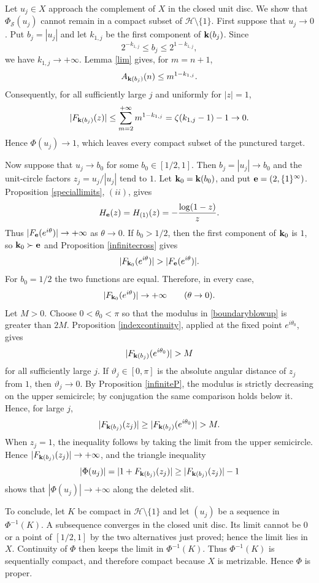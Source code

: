 \documentclass[12pt,a4paper]{amsart}
\makeatletter
\numberwithin{equation}{section}
\renewenvironment{proof}[1][Proof]{%
  \par\pushQED{\qed}%
  \normalfont\topsep6\p@\@plus6\p@\relax
  \trivlist
  \item[\hskip\labelsep\bfseries #1:]\ignorespaces
}{%
  \popQED\endtrivlist\@endpefalse
}
\theoremstyle{plain}
\theoremstyle{definition}
\makeatother
\begin{document}
\begin{proof}
Let $u_j\in X$ approach the complement of $X$ in the closed unit disc.  We show that $\Phi_{\mathcal{S}}(u_j)$ cannot remain in a compact subset of
$\mathcal{H}\setminus\{1\}$. First suppose that $u_j\rightarrow0$.  Put $b_j=|u_j|$ and let $k_{1,j}$ be the first component of ${\bf k}(b_j)$.  Since
\[
2^{-k_{1,j}}\leq b_j\leq 2^{1-k_{1,j}},
\]
we have $k_{1,j}\rightarrow+\infty$.  Lemma \ref{lim} gives, for $m=n+1$,
\[
A_{{\bf k}(b_j)}(n)\leq m^{1-k_{1,j}}.
\]
Consequently, for all sufficiently large $j$ and uniformly for $|z|=1$,
\[
|F_{{\bf k}(b_j)}(z)|
\leq\sum_{m=2}^{+\infty}m^{1-k_{1,j}}
=\zeta(k_{1,j}-1)-1
\rightarrow0.
\]
Hence $\Phi(u_j)\rightarrow1$, which leaves every compact subset of the punctured target.

Now suppose that $u_j\rightarrow b_0$ for some $b_0\in[1/2,1]$.  Then $b_j=|u_j|\rightarrow b_0$ and the unit-circle factors
$z_j=u_j/|u_j|$ tend to $1$.  Let ${\bf k}_0={\bf k}(b_0)$, and put
${\bf e}=(2,\{1\}^{\infty})$.  Proposition \ref{speciallimits}, $(ii)$, gives
\[
H_{\bf e}(z)=H_{(1)}(z)=-\frac{\log(1-z)}z.
\]
Thus $|F_{\bf e}(e^{i\theta})|\rightarrow+\infty$ as
$\theta\rightarrow0$.  If $b_0>1/2$, then the first component of ${\bf k}_0$ is $1$, so
${\bf k}_0\succ{\bf e}$ and Proposition \ref{infinitecross} gives
\[
|F_{{\bf k}_0}(e^{i\theta})|>|F_{\bf e}(e^{i\theta})|.
\]
For $b_0=1/2$ the two functions are equal.  Therefore, in every case,
\begin{equation}\label{boundaryblowup}
|F_{{\bf k}_0}(e^{i\theta})|\rightarrow+\infty
\qquad(\theta\rightarrow0).
\end{equation}
Let $M>0$.  Choose $0<\theta_0<\pi$ so that the modulus in
\eqref{boundaryblowup} is greater than $2M$.  Proposition \ref{indexcontinuity}, applied at the fixed point $e^{i\theta_0}$, gives
\[
|F_{{\bf k}(b_j)}(e^{i\theta_0})|>M
\]
for all sufficiently large $j$.  If $\vartheta_j\in[0,\pi]$ is the absolute angular distance of $z_j$ from $1$, then
$\vartheta_j\rightarrow0$.  By Proposition \ref{infiniteP}, the modulus is strictly decreasing on the upper semicircle; by conjugation the same comparison holds below it.  Hence, for large $j$,
\[
|F_{{\bf k}(b_j)}(z_j)|
\geq |F_{{\bf k}(b_j)}(e^{i\theta_0})|>M.
\]
When $z_j=1$, the inequality follows by taking the limit from the upper semicircle.  Hence $|F_{{\bf k}(b_j)}(z_j)|\rightarrow+\infty$, and the triangle inequality
\[
|\Phi(u_j)|=|1+F_{{\bf k}(b_j)}(z_j)|
\geq |F_{{\bf k}(b_j)}(z_j)|-1
\]
shows that $|\Phi(u_j)|\rightarrow+\infty$ along the deleted slit.

To conclude, let $K$ be compact in $\mathcal{H}\setminus\{1\}$ and let $(u_j)$ be a sequence in $\Phi^{-1}(K)$.  A subsequence converges in the closed unit disc.  Its limit cannot be $0$ or a point of $[1/2,1]$ by the two alternatives just proved; hence the limit lies in $X$.  Continuity of $\Phi$ then keeps the limit in $\Phi^{-1}(K)$.  Thus $\Phi^{-1}(K)$ is sequentially compact, and therefore compact because $X$ is metrizable.  Hence $\Phi$ is proper.
\end{proof}
\end{document}
